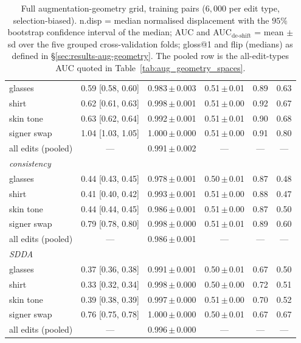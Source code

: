 \begin{table}[H]
\begin{tabular}{lccccc}
\;\;glasses & 0.59 [0.58, 0.60] & 0.983\,$\pm$\,0.003 & 0.51\,$\pm$\,0.01 & 0.89 & 0.63 \\
\;\;shirt & 0.62 [0.61, 0.63] & 0.998\,$\pm$\,0.001 & 0.51\,$\pm$\,0.00 & 0.92 & 0.67 \\
\;\;skin tone & 0.63 [0.62, 0.64] & 0.992\,$\pm$\,0.001 & 0.51\,$\pm$\,0.01 & 0.90 & 0.68 \\
\;\;signer swap & 1.04 [1.03, 1.05] & 1.000\,$\pm$\,0.000 & 0.51\,$\pm$\,0.00 & 0.91 & 0.80 \\
\;\;all edits (pooled) & --- & 0.991\,$\pm$\,0.002 & --- & --- & --- \\
\midrule
\multicolumn{6}{l}{\emph{consistency}} \\
\;\;glasses & 0.44 [0.43, 0.45] & 0.978\,$\pm$\,0.001 & 0.50\,$\pm$\,0.01 & 0.87 & 0.48 \\
\;\;shirt & 0.41 [0.40, 0.42] & 0.993\,$\pm$\,0.001 & 0.51\,$\pm$\,0.00 & 0.88 & 0.47 \\
\;\;skin tone & 0.44 [0.44, 0.45] & 0.986\,$\pm$\,0.001 & 0.51\,$\pm$\,0.00 & 0.87 & 0.50 \\
\;\;signer swap & 0.79 [0.78, 0.80] & 0.998\,$\pm$\,0.000 & 0.51\,$\pm$\,0.01 & 0.89 & 0.60 \\
\;\;all edits (pooled) & --- & 0.986\,$\pm$\,0.001 & --- & --- & --- \\
\midrule
\multicolumn{6}{l}{\emph{SDDA}} \\
\;\;glasses & 0.37 [0.36, 0.38] & 0.991\,$\pm$\,0.001 & 0.50\,$\pm$\,0.01 & 0.67 & 0.50 \\
\;\;shirt & 0.33 [0.32, 0.34] & 0.998\,$\pm$\,0.000 & 0.50\,$\pm$\,0.00 & 0.72 & 0.51 \\
\;\;skin tone & 0.39 [0.38, 0.39] & 0.997\,$\pm$\,0.000 & 0.51\,$\pm$\,0.00 & 0.70 & 0.52 \\
\;\;signer swap & 0.76 [0.75, 0.78] & 1.000\,$\pm$\,0.000 & 0.50\,$\pm$\,0.01 & 0.67 & 0.67 \\
\;\;all edits (pooled) & --- & 0.996\,$\pm$\,0.000 & --- & --- & --- \\
\bottomrule
\end{tabular}
\caption[Full augmentation-geometry grid, training pairs]{Full augmentation-geometry grid, training pairs ($6{,}000$ per edit type, selection-biased). n.disp = median normalised displacement with the $95\%$ bootstrap confidence interval of the median; AUC and AUC$_{\text{de-shift}}$ = mean $\pm$ sd over the five grouped cross-validation folds; gloss@1 and flip (medians) as defined in \S\ref{sec:results-aug-geometry}. The pooled row is the all-edit-types AUC quoted in Table~\ref{tab:aug_geometry_spaces}.}
\label{tab:aug_geometry_grid_train}
\end{table}

